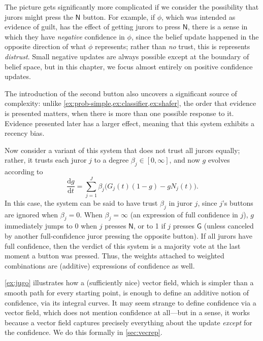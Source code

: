 \begin{subappendices}
\begin{example}
    The picture gets significantly more complicated if we consider the possibility
    that jurors might press the $\mathsf N$ button. For example, if $\phi$, which was intended
    as evidence of guilt, has the effect of getting jurors to press $\mathsf N$, there is a sense
    in which they have \emph{negative} confidence in $\phi$, since the belief update happened in the opposite direction of what $\phi$ represents; rather than \emph{no} trust, this is represents \emph{distrust}. 
    Small negative updates are always possible except at the boundary of belief space, but in this chapter, we focus almost entirely on positive confidence updates.

    The introduction of the second button also uncovers a significant source of complexity:
    unlike \cref{ex:prob-simple,ex:classifier,ex:shafer}, 
    the order that evidence is presented matters, when there is more than one possible response to it.
    Evidence presented later has a larger effect,
    meaning that this system exhibits a recency bias.

    Now consider a variant of this system that does
    not trust all jurors equally; rather, it trusts each juror $j$
    to a degree $\beta_j \in [0, \infty]$, and now $g$ evolves
    according to
    \[
    	\frac{\mathrm dg}{\mathrm dt} = 
    	\sum_{j = 1}^J \beta_j \Big( G_j(t) (1-g) 
    		- g N_j(t) \Big).
    \]
    In this case, the system can be said to have trust $\beta_j$ in juror
    $j$, since $j$'s buttons are ignored when $\beta_j = 0$. 
    When $\beta_j = \infty$ (an expression of full confidence in $j$),
    $g$ immediately jumps to 0 when $j$ presses 
    $\mathsf N$, or to 1 if $j$ presses $\mathsf G$ (unless canceled by
    another full-confidence juror pressing the opposite button).
    If all jurors have full confidence, then the verdict of this system is
    a majority vote at the last moment a button was pressed. 
    Thus, the weights attached to weighted combinations are (additive) expressions 
    of confidence as well. 
    \end{example}

    \cref{ex:jugo} illustrates how a (sufficiently nice) vector field, 
    	which is simpler than a smooth path for every starting point, is enough to define
    an additive notion of confidence, via its integral curves.
    It may seem strange to define confidence via a vector field, which does not mention confidence at all---but in a sense, it works because a vector field captures precisely everything about the update \emph{except} for the confidence. We do this formally in \cref{sec:vecrep}. 




\end{subappendices}
